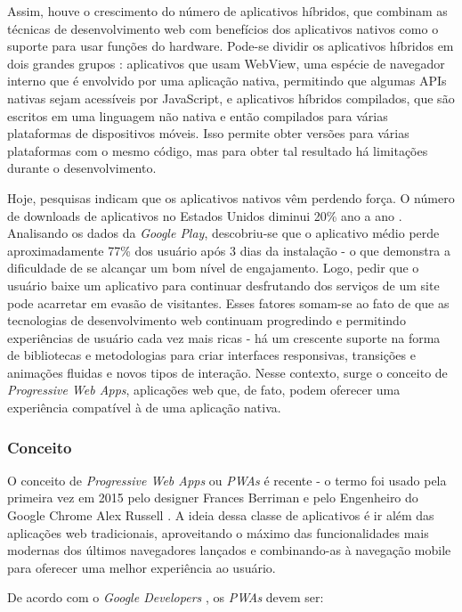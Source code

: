 Assim, houve o crescimento do número de aplicativos híbridos, que combinam as técnicas de desenvolvimento web com benefícios dos aplicativos nativos como o suporte para usar funções do hardware. Pode-se dividir os aplicativos híbridos em dois grandes grupos \cite{rudolph}: aplicativos que usam WebView, uma espécie de navegador interno que é envolvido por uma aplicação nativa, permitindo que algumas APIs nativas sejam acessíveis por JavaScript, e aplicativos híbridos compilados, que são escritos em uma linguagem não nativa e então compilados para várias plataformas de dispositivos móveis. Isso permite obter versões para várias plataformas com o mesmo código, mas para obter tal resultado há limitações durante o desenvolvimento.

Hoje, pesquisas indicam que os aplicativos nativos vêm perdendo força. O número de downloads de aplicativos no Estados Unidos diminui 20\% ano a ano \cite{benson}. Analisando os dados da \emph{Google Play}, descobriu-se que o aplicativo médio perde aproximadamente 77\% dos usuário após 3 dias da instalação \cite{chen} - o que demonstra a dificuldade de se alcançar um bom nível de engajamento. Logo, pedir que o usuário baixe um aplicativo para continuar desfrutando dos serviços de um site pode acarretar em evasão de visitantes. Esses fatores somam-se ao fato de que as tecnologias de desenvolvimento web continuam progredindo e permitindo experiências de usuário cada vez mais ricas - há um crescente suporte na forma de bibliotecas e metodologias para criar interfaces responsivas, transições e animações fluidas e novos tipos de interação. Nesse contexto, surge o conceito de \textit{Progressive Web Apps}, aplicações web que, de fato, podem oferecer uma experiência compatível à de uma aplicação nativa.

\subsubsection{Conceito}
O conceito de \textit{Progressive Web Apps} ou \emph{PWAs} é recente - o termo foi usado pela primeira vez em 2015 pelo designer Frances Berriman e pelo Engenheiro do Google Chrome Alex Russell \cite{russell}. A ideia dessa classe de aplicativos é ir além das aplicações web tradicionais, aproveitando o máximo das funcionalidades mais modernas dos últimos navegadores lançados e combinando-as à navegação mobile para oferecer uma melhor experiência ao usuário.

De acordo com o  \emph{Google Developers} \cite{googledevpwa}, os \emph{PWAs} devem ser:

